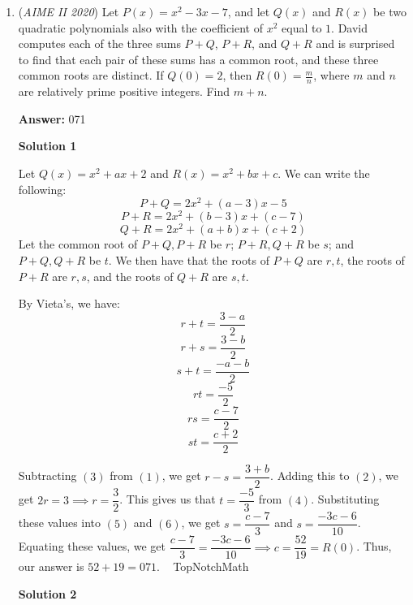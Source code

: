 \begin{enumerate}
 Thus, the sum of all possible $n$ is just $78+161 = \boxed{239}.$

 - ccx09

 \begin{verbatim}
There was a link to alcumus instead of a link to a video solution by OmegaLearn here. I tried to search up his video but I couldn't find it. Please find it and insert it here.
\end{verbatim}




	\item (\textit{AIME II 2020}) Let $P(x) = x^2 - 3x - 7$, and let $Q(x)$ and $R(x)$ be two quadratic polynomials also with the coefficient of $x^2$ equal to $1$. David computes each of the three sums $P + Q$, $P + R$, and $Q + R$ and is surprised to find that each pair of these sums has a common root, and these three common roots are distinct. If $Q(0) = 2$, then $R(0) = \frac{m}{n}$, where $m$ and $n$ are relatively prime positive integers. Find $m + n$.


 
 \textbf{Answer: }071



\textbf{Solution 1}

Let $Q(x) = x^2 + ax + 2$ and $R(x) = x^2 + bx + c$.  We can write the following:
 \[P + Q = 2x^2 + (a - 3)x - 5\]
 \[P + R = 2x^2 + (b - 3)x + (c - 7)\]
 \[Q + R = 2x^2 + (a + b)x + (c + 2)\]Let the common root of $P+Q,P+R$ be $r$; $P+R,Q+R$ be $s$; and $P+Q,Q+R$ be $t$.  We then have that the roots of $P+Q$ are $r,t$, the roots of $P + R$ are $r, s$, and the roots of $Q + R$ are $s,t$.

 By Vieta's, we have:
 \[r + t = \dfrac{3 - a}{2}\tag{1}\]
 \[r + s = \dfrac{3 - b}{2}\tag{2}\]
 \[s + t = \dfrac{-a - b}{2}\tag{3}\]
 \[rt = \dfrac{-5}{2}\tag{4}\]
 \[rs = \dfrac{c - 7}{2}\tag{5}\]
 \[st = \dfrac{c + 2}{2}\tag{6}\]

 Subtracting $(3)$ from $(1)$, we get $r - s = \dfrac{3 + b}{2}$.  Adding this to $(2)$, we get $2r = 3 \implies r = \dfrac{3}{2}$.  This gives us that $t = \dfrac{-5}{3}$ from $(4)$.  Substituting these values into $(5)$ and $(6)$, we get $s = \dfrac{c-7}{3}$ and $s = \dfrac{-3c - 6}{10}$.  Equating these values, we get $\dfrac{c-7}{3} = \dfrac{-3c-6}{10} \implies c = \dfrac{52}{19} = R(0)$.  Thus, our answer is $52 + 19 = \boxed{071}$. ~ TopNotchMath

 



\textbf{Solution 2}


\end{enumerate}
